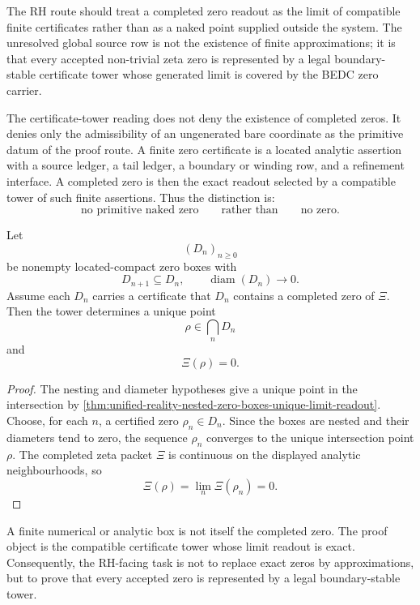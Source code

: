 \begin{principle}
\label{prin:rh-zeros-are-certificate-limits}
The RH route should treat a completed zero readout as the limit of
compatible finite certificates rather than as a naked point supplied
outside the system. The unresolved global source row is not the existence
of finite approximations; it is that every accepted non-trivial zeta zero
is represented by a legal boundary-stable certificate tower whose
generated limit is covered by the BEDC zero carrier.
\end{principle}

\begin{principle}
\label{prin:rh-no-naked-zero-not-no-zero}
The certificate-tower reading does not deny the existence of completed
zeros. It denies only the admissibility of an ungenerated bare coordinate
as the primitive datum of the proof route. A finite zero certificate is a
located analytic assertion with a source ledger, a tail ledger, a
boundary or winding row, and a refinement interface. A completed zero is
then the exact readout selected by a compatible tower of such finite
assertions. Thus the distinction is:
$$
\text{no primitive naked zero}
\qquad\text{rather than}\qquad
\text{no zero}.
$$
\end{principle}

\begin{theorem}
\label{thm:rh-finite-certificates-determine-exact-zeros}
Let
$$
(D_n)_{n\ge0}
$$
be nonempty located-compact zero boxes with
$$
D_{n+1}\subseteq D_n,
\qquad
\operatorname{diam}(D_n)\to0.
$$
Assume each $D_n$ carries a certificate that $D_n$ contains a completed
zero of $\Xi$. Then the tower determines a unique point
$$
\rho\in\bigcap_nD_n
$$
and
$$
\Xi(\rho)=0.
$$
\end{theorem}

\begin{proof}
The nesting and diameter hypotheses give a unique point in the
intersection by
\autoref{thm:unified-reality-nested-zero-boxes-unique-limit-readout}.
Choose, for each $n$, a certified zero $\rho_n\in D_n$. Since the boxes
are nested and their diameters tend to zero, the sequence $\rho_n$
converges to the unique intersection point $\rho$. The completed zeta
packet $\Xi$ is continuous on the displayed analytic neighbourhoods, so
$$
\Xi(\rho)=\lim_n\Xi(\rho_n)=0.
$$
\end{proof}

\begin{corollary}
\label{cor:rh-approximation-not-proof-object}
A finite numerical or analytic box is not itself the completed zero. The
proof object is the compatible certificate tower whose limit readout is
exact. Consequently, the RH-facing task is not to replace exact zeros by
approximations, but to prove that every accepted zero is represented by a
legal boundary-stable tower.
\end{corollary}

